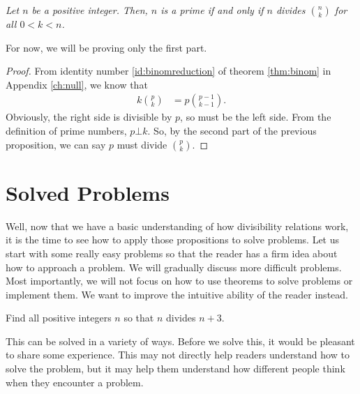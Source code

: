 \documentclass{subfile}
\begin{document}
		\begin{theorem}\slshape\label{thm:binpdiv}
			Let $n$ be a positive integer. Then, $n$ is a prime if and only if $n$ divides $\binom{n}{k}$ for all $0<k<n$.
		\end{theorem}%

	For now, we will be proving only the first part.

		\begin{proof}
			From identity number \ref{id:binomreduction} of theorem \eqref{thm:binom} in Appendix \ref{ch:null}, we know that
				\begin{align*}
					k\binom{p}{k} & = p\binom{p-1}{k-1}.
				\end{align*}
			Obviously, the right side is divisible by $p$, so must be the left side. From the definition of prime numbers, $p\bot k$. So, by the second part of the previous proposition, we can say $p$ must divide $\binom{p}{k}$.
		\end{proof}

\section{Solved Problems}
	Well, now that we have a basic understanding of how divisibility relations work, it is the time to see how to apply those propositions to solve problems. Let us start with some really easy problems so that the reader has a firm idea about how to approach a problem. We will gradually discuss more difficult problems. Most importantly, we will not focus on how to use theorems to solve problems or implement them. We want to improve the intuitive ability of the reader instead.

		\begin{problem}
			Find all positive integers $n$ so that $n$ divides $n+3$.
		\end{problem}

	This can be solved in a variety of ways. Before we solve this, it would be pleasant to share some experience. This may not directly help readers understand how to solve the problem, but it may help them understand how different people think when they encounter a problem.
\end{document}
